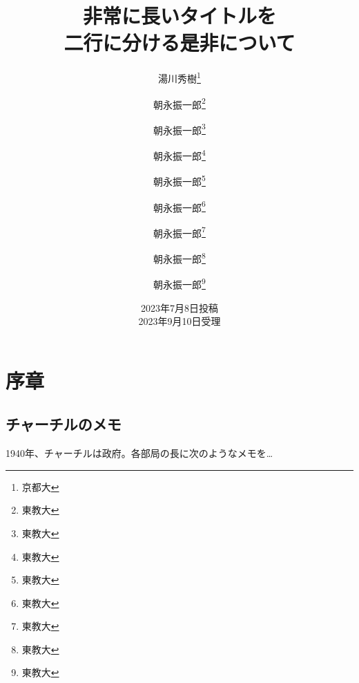 \documentclass{jlreq}
\begin{document}
\title{非常に長いタイトルを \\ 二行に分ける是非について}
\author{湯川秀樹\thanks{京都大} \and 朝永振一郎\thanks{東教大} 
\and 朝永振一郎\thanks{東教大} \and 朝永振一郎\thanks{東教大} 
\and 朝永振一郎\thanks{東教大} \and 朝永振一郎\thanks{東教大} 
\and 朝永振一郎\thanks{東教大} \and 朝永振一郎\thanks{東教大} 
\and 朝永振一郎\thanks{東教大} %
}
\date{2023年7月8日投稿 \\ 2023年9月10日受理}
\maketitle

\section{序章}
\subsection{チャーチルのメモ}
 1940年、チャーチルは政府。各部局の長に次のようなメモを…
\end{document}
